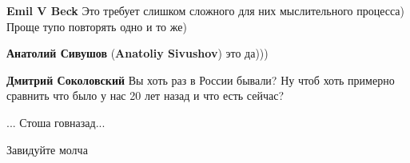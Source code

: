 \begin{itemize}
\begin{itemize}
\textbf{Emil V Beck} Это требует слишком сложного для них мыслительного процесса) Проще тупо повторять одно и то же)

\textbf{Анатолий Сивушов} (\textbf{Anatoliy Sivushov}) это да)))

\textbf{Дмитрий Соколовский} Вы хоть раз в России бывали? Ну чтоб хоть примерно сравнить что было у нас 20 лет назад и что есть сейчас?

\end{itemize} %

... Стоша говназад...

Завидуйте молча

\end{itemize} %
